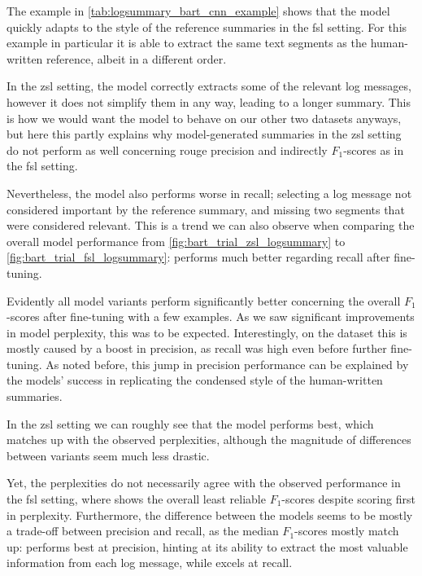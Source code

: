 The example in \autoref{tab:logsummary_bart_cnn_example} shows that the model
quickly adapts to the style of the reference summaries in the \ac{fsl} setting.
For this example in particular it is able to extract the same text segments as the human-written reference,
albeit in a different order.

In the \ac{zsl} setting, the model correctly extracts some of the relevant log messages,
however it does not simplify them in any way, leading to a longer summary.
This is how we would want the model to behave on our other two datasets anyways,
but here this partly explains why model-generated summaries in the \ac{zsl} setting do not perform
as well concerning \acs*{rouge} precision and indirectly \(F_1\)-scores as in the \ac{fsl} setting.

Nevertheless, the model also performs worse in recall;
selecting a log message not considered important by the reference summary,
and missing two segments that were considered relevant.
This is a trend we can also observe when comparing the overall model performance from
\autoref{fig:bart_trial_zsl_logsummary} to \autoref{fig:bart_trial_fsl_logsummary}:
 performs much better regarding recall after fine-tuning.

Evidently all model variants perform significantly better concerning the overall \(F_1\)-scores after fine-tuning with a few examples.
As we saw significant improvements in model perplexity, this was to be expected.
Interestingly, on the \logsummary{} dataset this is mostly caused by a boost in precision,
as recall was high even before further fine-tuning.
As noted before, this jump in precision performance can be explained by the models' success in replicating
the condensed style of the human-written summaries.

In the \ac{zsl} setting we can roughly see that the  model performs best,
which matches up with the observed perplexities,
although the magnitude of differences between variants seem much less drastic.

Yet, the perplexities do not necessarily agree with the observed performance in the \ac{fsl} setting,
where  shows the overall least reliable \(F_1\)-scores despite scoring first in perplexity.
Furthermore, the difference between the models seems to be mostly a trade-off between precision and recall,
as the median \(F_1\)-scores mostly match up:
 performs best at precision,
hinting at its ability to extract the most valuable information from each log message,
while  excels at recall.


